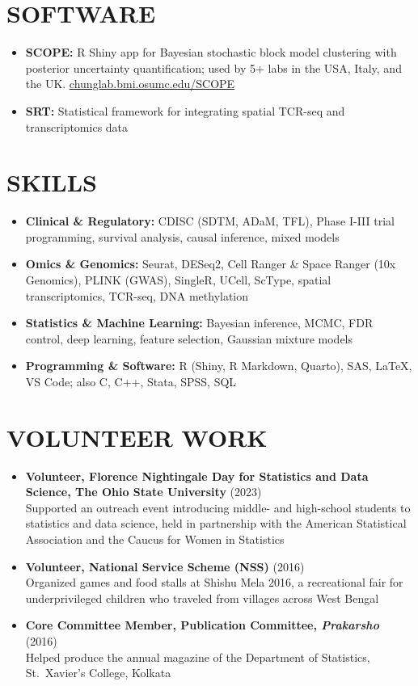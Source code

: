 \documentclass[11pt,a4paper,roman]{moderncv}        %
\begin{document}
\section{SOFTWARE}
\begin{itemize}
\item \textbf{SCOPE:} R Shiny app for Bayesian stochastic block model clustering with posterior uncertainty quantification; used by 5+ labs in the USA, Italy, and the UK. \href{https://chunglab.bmi.osumc.edu/SCOPE/}{chunglab.bmi.osumc.edu/SCOPE}
\vskip 0.1cm
\item \textbf{SRT:} Statistical framework for integrating spatial TCR-seq and transcriptomics data
\end{itemize}

\section{SKILLS}
\begin{itemize}
   \item \textbf{Clinical \& Regulatory:} CDISC (SDTM, ADaM, TFL), Phase I-III trial programming, survival analysis, causal inference, mixed models
   \item \textbf{Omics \& Genomics:} Seurat, DESeq2, Cell Ranger \& Space Ranger (10x Genomics), PLINK (GWAS), SingleR, UCell, ScType, spatial transcriptomics, TCR-seq, DNA methylation
   \item \textbf{Statistics \& Machine Learning:} Bayesian inference, MCMC, FDR control, deep learning, feature selection, Gaussian mixture models
   \item \textbf{Programming \& Software:} R (Shiny, R Markdown, Quarto), SAS, LaTeX, VS Code; also C, C++, Stata, SPSS, SQL
\end{itemize}

\section{VOLUNTEER WORK}
\begin{itemize}
\vskip 0.1cm
\item \textbf{Volunteer, Florence Nightingale Day for Statistics and Data Science, The Ohio State University} (2023)\\
Supported an outreach event introducing middle- and high-school students to statistics and data science, held in partnership with the American Statistical Association and the Caucus for Women in Statistics
\vskip 0.1cm
\item \textbf{Volunteer, National Service Scheme (NSS)} (2016)\\
Organized games and food stalls at Shishu Mela 2016, a recreational fair for underprivileged children who traveled from villages across West Bengal
\vskip 0.1cm
\item \textbf{Core Committee Member, Publication Committee, \textit{Prakarsho}} (2016)\\
Helped produce the annual magazine of the Department of Statistics, St.\ Xavier's College, Kolkata
\end{itemize}
\end{document}

